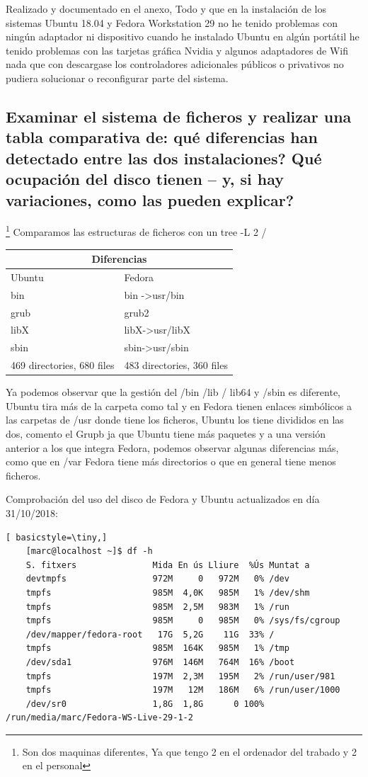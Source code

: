 \documentclass[preprint,11pt]{elsarticle}
\begin{document}
Realizado y documentado en el anexo, Todo y que en la instalación de los sistemas Ubuntu 18.04 y Fedora Workstation 29 no he tenido problemas con ningún adaptador ni dispositivo cuando he instalado Ubuntu en algún portátil he tenido problemas con las tarjetas gráfica Nvidia y algunos adaptadores de Wifi nada que con descargase los controladores adicionales públicos o privativos no pudiera solucionar o reconfigurar parte del sistema.

\subsection{Examinar el sistema de ficheros y realizar una tabla comparativa de: qué diferencias han detectado entre las dos instalaciones? Qué ocupación del disco tienen – y, si hay variaciones, como las pueden explicar?} 
\footnote{Son dos maquinas diferentes, Ya que tengo 2 en el ordenador del trabado y 2 en el personal} Comparamos las estructuras de ficheros con un tree -L 2 / 

\begin{tabular}{ |p{7cm}||p{7cm}| }
    \hline
    \multicolumn{2}{|c|}{Diferencias} \\
    \hline
    Ubuntu& Fedora\\
    \hline
   	bin   & bin -\textgreater  usr/bin   \\
    grub &   grub2 \\
    libX & libX-\textgreater usr/libX\\
    sbin & sbin-\textgreater usr/sbin\\
    469 directories, 680 files & 	483 directories, 360 files \\
    \hline
\end{tabular}

Ya podemos observar que la gestión del /bin /lib / lib64 y /sbin es diferente, Ubuntu tira más de la carpeta como tal y en Fedora tienen enlaces simbólicos a las carpetas de /usr donde tiene los ficheros, Ubuntu los tiene divididos en las dos, comento el Grupb ja que Ubuntu tiene más paquetes y a una versión anterior a los que integra Fedora, podemos observar algunas diferencias más, como que en /var Fedora tiene más directorios o que en general tiene menos ficheros. \bigskip

Comprobación del uso del disco de Fedora y Ubuntu actualizados en día 31/10/2018:
\begin{lstlisting}[ basicstyle=\tiny,]
    [marc@localhost ~]$ df -h
    S. fitxers               Mida En ús Lliure  %Ús Muntat a
    devtmpfs                 972M     0   972M   0% /dev
    tmpfs                    985M  4,0K   985M   1% /dev/shm
    tmpfs                    985M  2,5M   983M   1% /run
    tmpfs                    985M     0   985M   0% /sys/fs/cgroup
    /dev/mapper/fedora-root   17G  5,2G    11G  33% /
    tmpfs                    985M  164K   985M   1% /tmp
    /dev/sda1                976M  146M   764M  16% /boot
    tmpfs                    197M  2,3M   195M   2% /run/user/981
    tmpfs                    197M   12M   186M   6% /run/user/1000
    /dev/sr0                 1,8G  1,8G      0 100% /run/media/marc/Fedora-WS-Live-29-1-2

\end{lstlisting}
\end{document}
